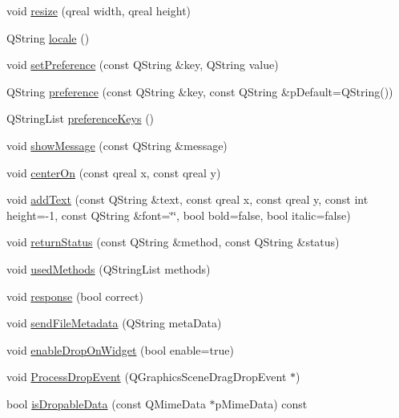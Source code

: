 \begin{DoxyCompactItemize}
\item 
void \hyperlink{class_u_b_widget_uniboard_a_p_i_afcc5dcca773487cf3b0d878d3616abc1}{resize} (qreal width, qreal height)
\item 
Q\-String \hyperlink{class_u_b_widget_uniboard_a_p_i_ac05a484dff565b2c7a4359c85a724809}{locale} ()
\item 
void \hyperlink{class_u_b_widget_uniboard_a_p_i_a9a6c2b3270887c5a8ff1cfb6e9f530a6}{set\-Preference} (const Q\-String \&key, Q\-String value)
\item 
Q\-String \hyperlink{class_u_b_widget_uniboard_a_p_i_aa0e0266fdfa1b04fe5ea36c9df438c94}{preference} (const Q\-String \&key, const Q\-String \&p\-Default=Q\-String())
\item 
Q\-String\-List \hyperlink{class_u_b_widget_uniboard_a_p_i_ac7968cfe8bf3e9576bd67c0546e784ee}{preference\-Keys} ()
\item 
void \hyperlink{class_u_b_widget_uniboard_a_p_i_a4be78c6409ca79ad472a68079cf1ec24}{show\-Message} (const Q\-String \&message)
\item 
void \hyperlink{class_u_b_widget_uniboard_a_p_i_a7e1a78f50c82b289fcec72f357394a05}{center\-On} (const qreal x, const qreal y)
\item 
void \hyperlink{class_u_b_widget_uniboard_a_p_i_aa897f74227bb93be8921064856c9a826}{add\-Text} (const Q\-String \&text, const qreal x, const qreal y, const int height=-\/1, const Q\-String \&font=\char`\"{}\char`\"{}, bool bold=false, bool italic=false)
\item 
void \hyperlink{class_u_b_widget_uniboard_a_p_i_aef1ab30622e14e2a0d4830d1e6be64a1}{return\-Status} (const Q\-String \&method, const Q\-String \&status)
\item 
void \hyperlink{class_u_b_widget_uniboard_a_p_i_a8364a7e4c9b84d7427c45cc4667a77ba}{used\-Methods} (Q\-String\-List methods)
\item 
void \hyperlink{class_u_b_widget_uniboard_a_p_i_af164e672a261c2023f22d38e1cc354b3}{response} (bool correct)
\item 
void \hyperlink{class_u_b_widget_uniboard_a_p_i_a85e28ea0f7d4f687a9bb4a830c6f830e}{send\-File\-Metadata} (Q\-String meta\-Data)
\item 
void \hyperlink{class_u_b_widget_uniboard_a_p_i_a705c72538c5b4971d3e7bfacae9173d8}{enable\-Drop\-On\-Widget} (bool enable=true)
\item 
void \hyperlink{class_u_b_widget_uniboard_a_p_i_a13f03a053e653a433b7d774ae0aa84dd}{Process\-Drop\-Event} (Q\-Graphics\-Scene\-Drag\-Drop\-Event $\ast$)
\item 
bool \hyperlink{class_u_b_widget_uniboard_a_p_i_a3409924615ea1a0f5cab767f0cedb6da}{is\-Dropable\-Data} (const Q\-Mime\-Data $\ast$p\-Mime\-Data) const 
\end{DoxyCompactItemize}
